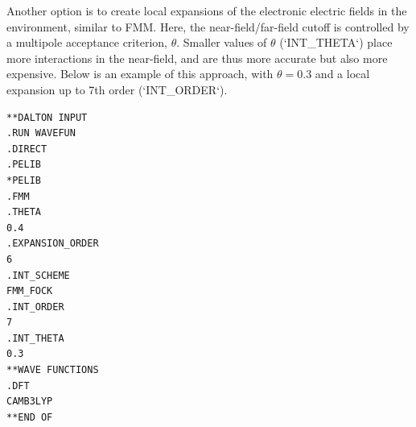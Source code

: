 Another option is to create local expansions of the electronic electric fields
in the environment, similar to FMM. Here, the near-field/far-field cutoff is
controlled by a multipole acceptance criterion, $\theta$. Smaller values of
$\theta$ (`INT\_THETA`) place more interactions in the near-field, and are thus
more accurate but also more expensive. Below is an example of this approach,
with $\theta=0.3$ and a local expansion up to 7th order (`INT\_ORDER`).

\begin{verbatim}
**DALTON INPUT
.RUN WAVEFUN
.DIRECT
.PELIB
*PELIB
.FMM
.THETA
0.4
.EXPANSION_ORDER
6
.INT_SCHEME
FMM_FOCK
.INT_ORDER
7
.INT_THETA
0.3
**WAVE FUNCTIONS
.DFT
CAMB3LYP
**END OF
\end{verbatim}
